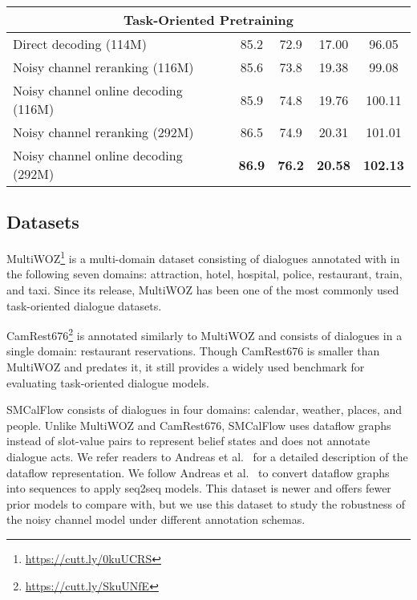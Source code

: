 \documentclass[11pt,a4paper]{article}
\begin{document}
\begin{table*}[t]
\begin{tabular}{lcccc}
 \midrule
        \multicolumn{5}{c}{Task-Oriented Pretraining} \\ \midrule
        Direct decoding (114M) & 85.2 & 72.9 & 17.00 & 96.05 \\
        Noisy channel reranking (116M) & 85.6 & 73.8 & 19.38 & 99.08\\
        Noisy channel online decoding (116M) & 85.9 & 74.8 & 19.76 & 100.11\\
        Noisy channel reranking (292M) & 86.5 & 74.9 & 20.31 & 101.01 \\
        Noisy channel online decoding (292M) & \textbf{86.9} & \textbf{76.2} & \textbf{20.58} & \textbf{102.13} \\
    \bottomrule
\end{tabular}
\caption{MultiWOZ test results (end-to-end modeling with generated beliefs) with seq2seq approaches. Results are significant (p < 0.01) comparing noisy channel decoding and direct decoding.  \citet{yang2020ubar} also report a combined score of 105.1 with an alternative context and evaluation setting, contributions orthogonal to our work and the other benchmarks reported here.} 
    \label{tab:multiwoz_end2end}
\end{table*}


\subsection{Datasets \label{sec:datasets}}



MultiWOZ\footnote{\url{https://cutt.ly/0kuUCRS}} is a multi-domain dataset consisting of dialogues annotated with  in the following seven domains: attraction, hotel, hospital, police, restaurant, train, and taxi. Since its release, MultiWOZ has been one of the most commonly used task-oriented dialogue datasets. 

CamRest676\footnote{\url{https://cutt.ly/SkuUNfE}} is annotated similarly to MultiWOZ and consists of dialogues in a single domain: restaurant reservations. Though CamRest676 is smaller than MultiWOZ and predates it, it still provides a widely used benchmark for evaluating task-oriented dialogue models. 

SMCalFlow consists of dialogues in four domains: calendar, weather, places, and people. Unlike MultiWOZ and CamRest676, SMCalFlow uses dataflow graphs instead of slot-value pairs to represent belief states and does not annotate dialogue acts. We refer readers to Andreas et al.\  for a detailed description of the dataflow representation. We follow Andreas et al.\  to convert dataflow graphs into sequences to apply seq2seq models. This dataset is newer and offers fewer prior models to compare with, but we use this dataset to study the robustness of the noisy channel model under different annotation schemas. 
\end{document}
